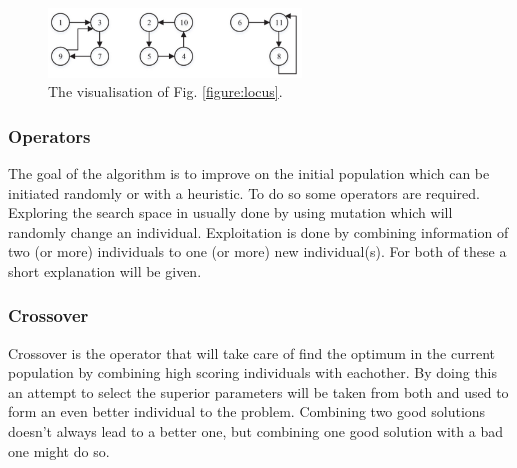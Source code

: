 \begin{figure}
\begin{center}
\includegraphics[width=0.6\textwidth]{encode.png}
\caption{The visualisation of Fig. \ref{figure:locus}.}\label{figure:encode}
\end{center}
\end{figure}

\subsubsection{Operators}
The goal of the algorithm is to improve on the initial population which can be initiated randomly or with a heuristic.
To do so some operators are required.
Exploring the search space in usually done by using mutation which will randomly change an individual.
Exploitation is done by combining information of two (or more) individuals to one (or more) new individual(s).
For both of these a short explanation will be given.
\newpage
\subsubsection*{Crossover}
Crossover is the operator that will take care of find the optimum in the current population by combining high scoring individuals with eachother.
By doing this an attempt to select the superior parameters will be taken from both and used to form an even better individual to the problem.
Combining two good solutions doesn't always lead to a better one, but combining one good solution with a bad one might do so.

